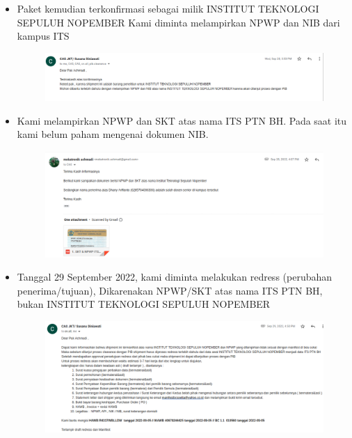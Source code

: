 \documentclass{article} %
\begin{document}
\begin{itemize}
		\item Paket kemudian terkonfirmasi sebagai milik INSTITUT TEKNOLOGI SEPULUH NOPEMBER 
		Kami diminta melampirkan NPWP dan NIB dari kampus ITS
		
		\begin{figure}[!ht]
			\centering
			\includegraphics[width=400pt]{images/impor_6}
		\end{figure}
	
		\newpage
		\item Kami melampirkan NPWP dan SKT atas nama ITS PTN BH.
		Pada saat itu kami belum paham mengenai dokumen NIB.
		
		\begin{figure}[!ht]
			\centering
			\includegraphics[width=400pt]{images/impor_7}
		\end{figure}
	
		\item Tanggal 29 September 2022, kami diminta melakukan redress (perubahan penerima/tujuan),
		Dikarenakan NPWP/SKT atas nama ITS PTN BH, bukan INSTITUT TEKNOLOGI SEPULUH NOPEMBER
		
		\begin{figure}[!ht]
			\centering
			\includegraphics[width=400pt]{images/impor_8}
		\end{figure}
	

\end{itemize}
\end{document}
